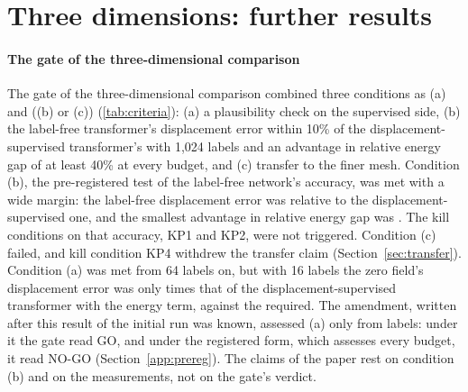 \section{Three dimensions: further results}\label{supp:three}

\paragraph{The gate of the three-dimensional comparison}
The gate of the three-dimensional comparison combined three conditions as (a) and ((b) or
(c)) (\cref{tab:criteria}): (a) a plausibility check on the supervised side, (b) the label-free
transformer's displacement error within 10\% of the displacement-supervised transformer's
with 1,024 labels and an advantage in relative energy gap of at least 40\% at every budget,
and (c) transfer to the finer mesh. Condition (b), the pre-registered test of the label-free
network's accuracy, was met with a wide margin: the label-free displacement error was
\numGTwoParity{} relative to the displacement-supervised one, and the smallest advantage in relative energy gap was \numGTwoAdvMin{}. The kill conditions on
that accuracy, KP1 and KP2,
were not triggered. Condition (c) failed, and kill condition KP4 withdrew the transfer claim
(Section~\ref{sec:transfer}). Condition (a) was met from 64 labels on, but with 16 labels
the zero field's displacement error was only \numGTwoSanitySixteen{} times that of the
displacement-supervised transformer with the energy term, against the
\numGTwoSanityX{} required. The amendment, written after this result of the initial run was
known, assessed (a) only from \numGTwoFloor{} labels: under it the gate read GO, and under
the registered form, which assesses every budget, it read NO-GO (Section~\ref{app:prereg}).
The claims of the paper rest on condition (b) and on the measurements, not on the gate's
verdict.

